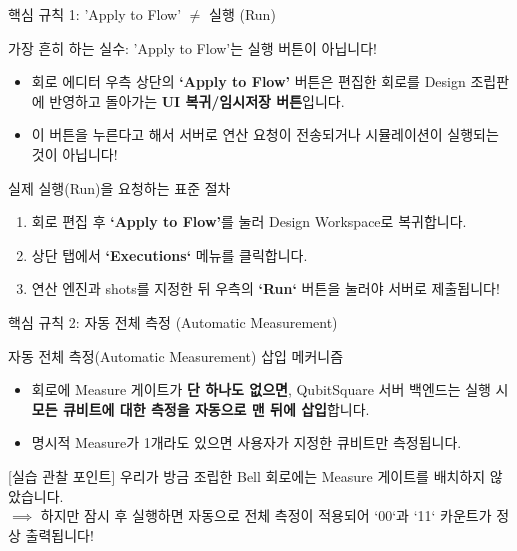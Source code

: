\documentclass[aspectratio=169, 10pt]{beamer}
\begin{document}
\begin{frame}{핵심 규칙 1: 'Apply to Flow' $\neq$ 실행 (Run)}
    \begin{qcalert}{{가장 흔히 하는 실수: 'Apply to Flow'는 실행 버튼이 아닙니다!}}
        \begin{itemize}
            \item 회로 에디터 우측 상단의 \textbf{‘Apply to Flow’} 버튼은 편집한 회로를 Design 조립판에 반영하고 돌아가는 \textbf{UI 복귀/임시저장 버튼}입니다.
            \pause
            \item 이 버튼을 누른다고 해서 서버로 연산 요청이 전송되거나 시뮬레이션이 실행되는 것이 아닙니다!
        \end{itemize}
    \end{qcalert}
    \vspace{0.2cm}
    \begin{qcblock}{실제 실행(Run)을 요청하는 표준 절차}
        \begin{enumerate}
            \item 회로 편집 후 \textbf{‘Apply to Flow’}를 눌러 Design Workspace로 복귀합니다.
            \pause
            \item 상단 탭에서 \textbf{`Executions`} 메뉴를 클릭합니다.
            \pause
            \item 연산 엔진과 shots를 지정한 뒤 우측의 \textbf{`Run`} 버튼을 눌러야 서버로 제출됩니다!
        \end{enumerate}
    \end{qcblock}
\end{frame}

\begin{frame}{핵심 규칙 2: 자동 전체 측정 (Automatic Measurement)}
    \begin{qcblock}{자동 전체 측정(Automatic Measurement) 삽입 메커니즘}
        \begin{itemize}
            \item 회로에 Measure 게이트가 \textbf{단 하나도 없으면}, QubitSquare 서버 백엔드는 실행 시 \textbf{모든 큐비트에 대한 측정을 자동으로 맨 뒤에 삽입}합니다.
            \pause
            \item 명시적 Measure가 1개라도 있으면 사용자가 지정한 큐비트만 측정됩니다.
        \end{itemize}
    \end{qcblock}
    \vspace{0.3cm}
    \begin{qctip}{[실습 관찰 포인트]}
        우리가 방금 조립한 Bell 회로에는 Measure 게이트를 배치하지 않았습니다.\\
        $\implies$ 하지만 잠시 후 실행하면 자동으로 전체 측정이 적용되어 `00`과 `11` 카운트가 정상 출력됩니다!
    \end{qctip}
\end{frame}
\end{document}
